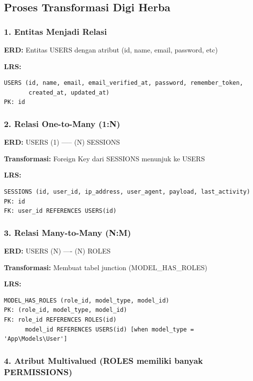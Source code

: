 \documentclass[12pt,a4paper]{article}
\begin{document}
\subsection{Proses Transformasi Digi Herba}

\subsubsection{1. Entitas Menjadi Relasi}

\noindent\textbf{ERD:} Entitas USERS dengan atribut (id, name, email, password, etc)

\noindent\textbf{LRS:}
\begin{verbatim}
USERS (id, name, email, email_verified_at, password, remember_token, 
       created_at, updated_at)
PK: id
\end{verbatim}

\subsubsection{2. Relasi One-to-Many (1:N)}

\noindent\textbf{ERD:} USERS (1) ----- (N) SESSIONS

\noindent\textbf{Transformasi:} Foreign Key dari SESSIONS menunjuk ke USERS

\noindent\textbf{LRS:}
\begin{verbatim}
SESSIONS (id, user_id, ip_address, user_agent, payload, last_activity)
PK: id
FK: user_id REFERENCES USERS(id)
\end{verbatim}

\subsubsection{3. Relasi Many-to-Many (N:M)}

\noindent\textbf{ERD:} USERS (N) ---- (N) ROLES

\noindent\textbf{Transformasi:} Membuat tabel junction (MODEL\_HAS\_ROLES)

\noindent\textbf{LRS:}
\begin{verbatim}
MODEL_HAS_ROLES (role_id, model_type, model_id)
PK: (role_id, model_type, model_id)
FK: role_id REFERENCES ROLES(id)
      model_id REFERENCES USERS(id) [when model_type = 'App\Models\User']
\end{verbatim}

\subsubsection{4. Atribut Multivalued (ROLES memiliki banyak PERMISSIONS)}
\end{document}
